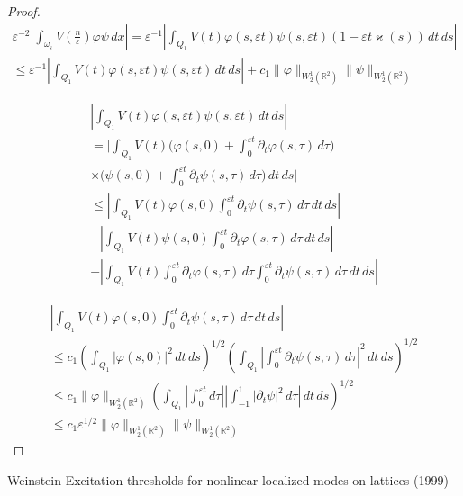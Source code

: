 \documentclass[reqno]{amsart}
\theoremstyle{plain}
\numberwithin{equation}{section}
\renewcommand{\kappa}{\varkappa}
\newcommand{\Real}{\mathbb R}
\newcommand{\eps}{\varepsilon}
\renewcommand{\phi}{\varphi}
\renewcommand{\leq}{\leqslant}
\newcommand\nep{\textstyle\frac n\eps}
\begin{document}
\begin{proof}
\begin{multline*}
 \eps^{-2}\left|\int_{\omega_\eps}V(\nep)\phi \psi\,dx\right|=
  \eps^{-1}\left|\int_{Q_1}V(t)\phi(s,\eps t) \psi(s,\eps t)
(1-\eps t \kappa(s) )\,dt\,ds\right|\\\leq \eps^{-1}\left|\int_{Q_1}V(t)\phi(s,\eps t) \psi(s,\eps t)
\,dt\,ds\right|+c_1\|\phi\|_{W_2^1(\Real^2)}\|\psi\|_{W_2^1(\Real^2)}
\end{multline*}

\begin{multline*}
\left|\int_{Q_1}V(t)\phi(s,\eps t) \psi(s,\eps t)
\,dt\,ds\right|
\\= \bigg|\int_{Q_1}V(t)\bigg(\phi(s,0)
+\int_0^{\eps t}\partial_t\phi(s,\tau)\,d \tau\bigg)
\\\times\bigg(\psi(s,0)+\int_0^{\eps t}\partial_t\psi(s,\tau)\,d \tau\bigg)\,dt\,ds\bigg|
\\\leq  \left|\int_{Q_1}V(t)
\phi(s,0)\int_0^{\eps t}\partial_t\psi(s,\tau)\,d \tau\,dt\,ds\right|
\\
+\left|\int_{Q_1}V(t)
\psi(s,0)\int_0^{\eps t}\partial_t\phi(s,\tau)\,d \tau\,dt\,ds\right|
\\
+\left|\int_{Q_1}V(t)\int_0^{\eps t}\partial_t\phi(s,\tau)\,d \tau\int_0^{\eps t}\partial_t\psi(s,\tau)\,d \tau\,dt\,ds\right|
\end{multline*}



\begin{multline*}
 \left|\int_{Q_1}V(t)
\phi(s,0)\int_0^{\eps t}\partial_t\psi(s,\tau)\,d \tau\,dt\,ds\right|
\\\leq c_1 \left(\int_{Q_1}|\phi(s,0)|^2\,dt\,ds\right)^{1/2}
\left(\int_{Q_1}\left|\int_0^{\eps t}\partial_t\psi(s,\tau)\,d \tau\right|^2\,dt\,ds\right)^{1/2}
\\\leq c_1 \|\phi\|_{W_2^1(\Real^2)}
\left(\int_{Q_1}
\left|\int_0^{\eps t}d \tau\right|
\left|\int_{-1}^{1}|\partial_t\psi|^2\,d \tau\right|\,dt\,ds\right)^{1/2}
\\\leq c_1\eps^{1/2} \|\phi\|_{W_2^1(\Real^2)}\|\psi\|_{W_2^1(\Real^2)}
\end{multline*}

\end{proof}



Weinstein Excitation thresholds for nonlinear localized modes on lattices (1999)
\end{document}
